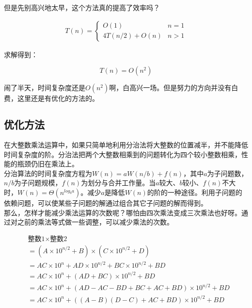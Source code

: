 但是先别高兴地太早，这个方法真的提高了效率吗？

\vspace{-0.5cm}

\begin{align*}
	T(n) = \begin{cases}
		O(1)           & n = 1 \\
		4T(n/2) + O(n) & n > 1
	\end{cases}
\end{align*}

求解得到：

\vspace{-0.5cm}

$$
	T(n) = O(n^2)
$$

闹了半天，时间复杂度还是$ O(n^2) $啊，白高兴一场。但是努力的方向并没有白费，这里还是有优化的方法的。\\

\subsection{优化方法}

在大整数乘法运算中，如果只简单地利用分治法将大整数的位置减半，并不能降低时间复杂度的阶。分治法把两个大整数相乘到的问题转化为四个较小整数相乘，性能的瓶颈仍旧在乘法上。\\

分治算法的时间复杂度方程为$ W(n) = aW(n/b) + f(n) $，其中$ a $为子问题数，$ n / b $为子问题规模，$ f(n) $为划分与合并工作量。当$ a $较大、$ b $较小、$ f(n) $不大时，$ W(n) = \Theta(n^{log_ba}) $。减少$ a $是降低$ W(n) $的阶的一种途径。利用子问题的依赖问题，可以使某些子问题的解通过组合其它子问题的解而得到。\\

那么，怎样才能减少乘法运算的次数呢？哪怕由四次乘法变成三次乘法也好呀。通过对之前的乘法等式做一些调整，可以减少乘法的次数。

\vspace{-1cm}

\begin{align*}
	 & \text{整数1} \times \text{整数2}                                      \\
	 & = (A \times 10^{n/2} + B) \times (C \times 10^{n/2} + D)              \\
	 & = AC \times 10^n + AD \times 10^{n/2} + BC \times 10^{n/2} + BD       \\
	 & = AC \times 10^n + (AD + BC) \times 10^{n/2} + BD                     \\
	 & = AC \times 10^n + (AD - AC - BD + BC + AC + BD) \times 10^{n/2} + BD \\
	 & = AC \times 10^n + ((A - B)(D - C) + AC + BD) \times 10^{n/2} + BD
\end{align*}

